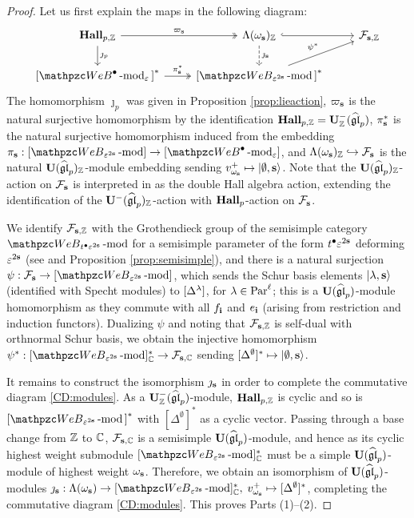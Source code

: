 \begin{proof}
Let us first explain the maps in the following diagram:
\begin{equation}  
\label{CD:modules}
\begin{tikzcd}
\HallZ \ar[r,two heads,"\varpi_\bfs"]\ar[d,"\jmath_p"]& \Lambda (\omega_\bfs)_\Z \ar[r,hook] \ar[d, dashed,"\jmath_\bfs"] &\cF_{\bfs,\Z} \\
{[}\qAW \modf_\eps{]}^* \ar[r,two heads,"\pi_\bfs^*"]&  {[}\qW_{\eps^{2\bfs}} \modf{]}^*  \ar[ur,"\psi^*"]
\end{tikzcd} 
\end{equation}
The homomorphism $\jmath_p$ was given in Proposition \ref{prop:lieaction}, $\varpi_{\mathbf{s}}$ is the natural surjective homomorphism by the identification $\bold{Hall}_{p,\mathbb{Z}} =\bold{U}_{\mathbb{Z}}^-(\widehat{\mathfrak{gl}}_p)$, $\pi_{\mathbf{s}}^*$ is the natural surjective homomorphism induced from the embedding $\pi_\bfs: [\qW_{\eps^{2\bfs}} \modf] \rightarrow [\qAW \modf_\eps]$, and $\Lambda (\omega_{\mathbf{s}})_{\mathbb{Z}} \hookrightarrow\mathcal{F}_{\mathbf{s}}$ is the natural $\bold{U}(\widehat{\mathfrak {gl}}_p)_{\mathbb{Z}}$-module embedding sending $v^+_{\omega_{\mathbf{s}}}\mapsto |\emptyset,\mathbf{s}\rangle$. Note that the $\bold{U}(\widehat{\mathfrak {gl}}_p)_{\mathbb{Z}}$-action on $\mathcal{F}_{\mathbf{s}}$ is interpreted in \cite{DX17} as the double Hall algebra action, extending the identification of the $\bold{U}^-(\widehat{\mathfrak {gl}}_p)_{\mathbb{Z}}$-action with $\bold{Hall}_{p}$-action on $\mathcal{F}_{\mathbf{s}}$.

We identify $\mathcal{F}_{\mathbf{s},\mathbb{Z}}$ with the Grothendieck group of the semisimple category $\qW_{t^\bullet\eps^{2\bfs}}\modf$ for a semisimple parameter of the form $t^\bullet\varepsilon^{2\mathbf{s}}$ deforming $\varepsilon^{2\mathbf{s}}$ (see \cite[(4.5)]{Ar96} and Proposition \ref{prop:semisimple}), and there is a natural surjection $\psi:\cF_\bfs \rightarrow [\qW_{\eps^{2\bfs}} \modf]$, which sends the Schur basis elements $|\lambda,\mathbf{s}\rangle$ (identified with Specht modules) to $[\Delta^{\lambda}]$, for $\lambda\in \text{Par}^\ell$; this is a $\bold{U}(\widehat{\mathfrak {gl}}_p)$-module homomorphism as they commute with all $f_{\mathbf{i}}$ and $e_{\mathbf{i}}$ (arising from restriction and induction functors). Dualizing $\psi$ and noting that $\mathcal{F}_{\mathbf{s},\mathbb{Z}}$ is self-dual with orthnormal Schur basis, we obtain the injective homomorphism $\psi^*: [\qW_{\eps^{2\bfs}} \modf]_\C^*\rightarrow \cF_{\bfs,\C}$ sending $[\Delta^\emptyset]^* \mapsto |\emptyset,\mathbf{s}\rangle$.

It remains to construct the isomorphism $\jmath_{\mathbf{s}}$ in order to complete the commutative diagram \eqref{CD:modules}. As a $\bold{U}_{\mathbb{Z}}^-(\widehat{\mathfrak{gl}}_p)$-module, $\bold{Hall}_{p,\mathbb{Z}}$ is cyclic and so is ${[}\qW_{\eps^{2\bfs}} \modf{]}^*$ with $[\Delta^\emptyset]^*$ as a cyclic vector. Passing through a base change from $\mathbb{Z}$ to $\mathbb{C}$, $\mathcal{F}_{\mathbf{s},\mathbb{C}}$ is a semisimple $\bold{U}(\widehat{\mathfrak {gl}}_p)$-module, and
hence as its cyclic highest weight submodule $[\qW_{\eps^{2\bfs}} \modf]_\C^*$ must be a simple $\bold{U}(\widehat{\mathfrak {gl}}_p)$-module of highest weight $\omega_{\mathbf{s}}$. Therefore, we obtain an isomorphism of $\bold{U}(\widehat{\mathfrak {gl}}_p)$-modules $\jmath_\bfs: \Lambda (\omega_\bfs)   \rightarrow  [\qW_{\eps^{2\bfs}} \modf]^*_\C,$ $v^+_{\omega_{\mathbf{s}}} \mapsto[\Delta^\emptyset]^*$, completing the commutative diagram \eqref{CD:modules}. This proves Parts (1)--(2).


\end{proof}
